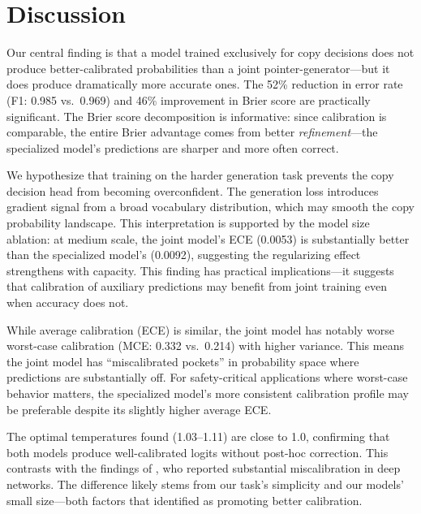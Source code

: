 \section{Discussion}
\label{sec:discussion}

 Our central finding is that a model trained exclusively for copy decisions does not produce better-calibrated probabilities than a joint pointer-generator---but it does produce dramatically more accurate ones. The 52\% reduction in error rate (F1: 0.985 vs.\ 0.969) and 46\% improvement in Brier score are practically significant. The Brier score decomposition is informative: since calibration is comparable, the entire Brier advantage comes from better \emph{refinement}---the specialized model's predictions are sharper and more often correct.

 We hypothesize that training on the harder generation task prevents the copy decision head from becoming overconfident. The generation loss introduces gradient signal from a broad vocabulary distribution, which may smooth the copy probability landscape. This interpretation is supported by the model size ablation: at medium scale, the joint model's ECE (0.0053) is substantially better than the specialized model's (0.0092), suggesting the regularizing effect strengthens with capacity. This finding has practical implications---it suggests that calibration of auxiliary predictions may benefit from joint training even when accuracy does not.

 While average calibration (ECE) is similar, the joint model has notably worse worst-case calibration (MCE: 0.332 vs.\ 0.214) with higher variance. This means the joint model has ``miscalibrated pockets'' in probability space where predictions are substantially off. For safety-critical applications where worst-case behavior matters, the specialized model's more consistent calibration profile may be preferable despite its slightly higher average ECE.

 The optimal temperatures found (1.03--1.11) are close to 1.0, confirming that both models produce well-calibrated logits without post-hoc correction. This contrasts with the findings of \citet{guo2017calibration}, who reported substantial miscalibration in deep networks. The difference likely stems from our task's simplicity and our models' small size---both factors that \citet{guo2017calibration} identified as promoting better calibration.

